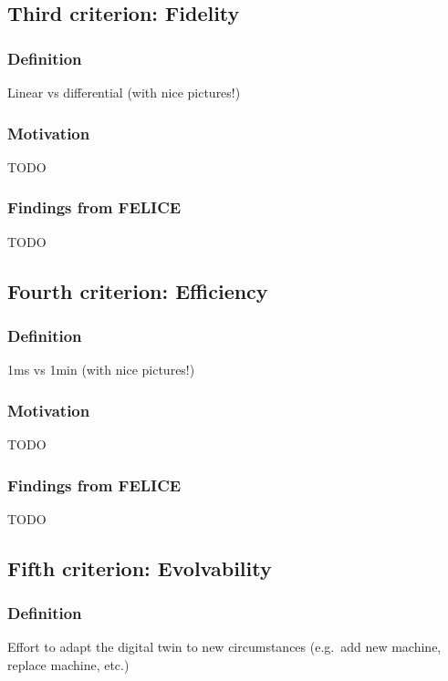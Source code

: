 \documentclass[9pt,conference]{IEEEtran}
\begin{document}
    \subsection{Third criterion: Fidelity}
    
    \subsubsection{Definition}
    Linear vs differential (with nice pictures!)

    \subsubsection{Motivation}
    TODO

    \subsubsection{Findings from FELICE}
    TODO

    \subsection{Fourth criterion: Efficiency}
    
    \subsubsection{Definition}
    1ms vs 1min (with nice pictures!)

    \subsubsection{Motivation}
    TODO

    \subsubsection{Findings from FELICE}
    TODO

    \subsection{Fifth criterion: Evolvability}
    
    \subsubsection{Definition}
    Effort to adapt the digital twin to new circumstances (e.g.\ add new machine, replace machine, etc.)
\end{document}
